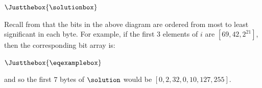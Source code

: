\begin{formulae}
  \item $\Justthebox{\solutionbox}$
\end{formulae}

\introlist
Recall from  that the bits in the above diagram are
ordered from most to least significant in each byte.
For example, if the first $3$ elements of $i$ are $[69, 42, 2^{21}]$,
then the corresponding bit array is:

\begin{formulae}
  \item $\Justthebox{\eqexamplebox}$
\end{formulae}

and so the first $7$ bytes of $\solution$ would be
$[0, 2, 32, 0, 10, 127, 255]$.


